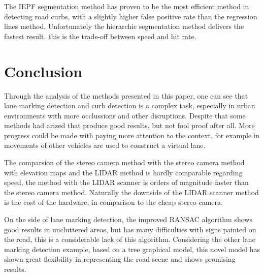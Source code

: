 \documentclass[conference]{IEEEtran}
\begin{document}
\begin{table}
\centering
\caption{Method speed evaluation}
\end{table}


The IEPF segmentation method has proven to be the most efficient method in detecting road curbs, with a slightly higher false positive rate than the regression lines method. Unfortunately the hierarchic segmentation method delivers the fastest result, this is the trade-off between speed and hit rate.


\section{Conclusion}
Through the analysis of the methods presented in this paper, one can see that lane marking detection and curb detection is a complex task, especially in urban environments with more occlussions and other disruptions. Despite that some methods had arized that produce good results, but not fool proof after all. More progress could be made with paying more attention to the context, for example in \cite{virtuallane} movements of other vehicles are used to construct a virtual lane.

The comparsion of the stereo camera method with the stereo camera method with elevation maps and the LIDAR method is hardly comparable regarding speed, the method with the LIDAR scanner is orders of magnitude faster than the stereo camera method. Naturally the downside of the LIDAR scanner method is the cost of the hardware, in comparison to the cheap stereo camera. 

On the side of lane marking detection, the improved RANSAC algorithm shows good results in uncluttered areas, but has many difficulties with signs painted on the road, this is a considerable lack of this algorithm. Considering the other lane marking detection example, based on a tree graphical model, this novel model has shown great flexibility in representing the road scene and shows promising results.  


\nocite{*}





\end{document}
